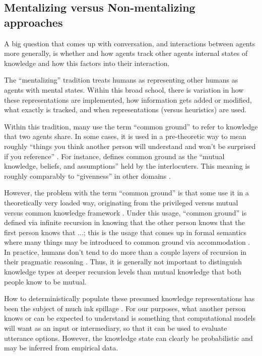 \documentclass[]{article}
\begin{document}
\subsection{Mentalizing versus Non-mentalizing approaches}

A big question that comes up with conversation, and interactions between agents more generally, is whether and how agents track other agents internal states of knowledge and how this factors into their interaction.

The ``mentalizing'' tradition treats humans as representing other humans as agents with mental states. Within this broad school, there is variation in how these representations are implemented, how information gets added or modified, what exactly is tracked, and when representations (versus heuristics) are used. 

Within this tradition, many use the term ``common ground'' to refer to knowledge that two agents share. In some cases, it is used in a pre-theoretic way to mean roughly ``things you think another person will understand and won't be surprised if you reference'' \citep{leung2023, garrison2022}. For instance,  \citet{hanna2003} defines common ground as the ``mutual knowledge, beliefs, and assumptions'' held by the interlocuters. This meaning is roughly comparably to ``givenness'' in other domains \citep{fay2010}. 

 However, the problem with the term ``common ground'' is that some use it in a theoretically very loaded way, originating from the privileged versus mutual versus common knowledge framework \citep{clark1996}. Under this usage, ``common ground'' is defined via infinite recursion in knowing that the other person knows that the first person knows that ...; this is the usage that comes up in formal semantics where many things may be introduced to common ground via accommodation \citep{horton1996, pickering2004}. In practice, humans don't tend to do more than a couple layers of recursion in their pragmatic reasoning \citep{franke2016}. Thus, it is generally not important to distinguish knowledge types at deeper recursion levels than mutual knowledge that both people know to be mutual. 

How to deterministically populate these presumed knowledge representations has been the subject of much ink spillage \citep{horton1996,clark1996, brown-schmidt2012}. For our purposes, what another person knows or can be expected to understand is something that computational models will want as an input or intermediary, so that it can be used to evaluate utterance options. However, the knowledge state can clearly be probabilistic and may be inferred from empirical data. 
\end{document}
